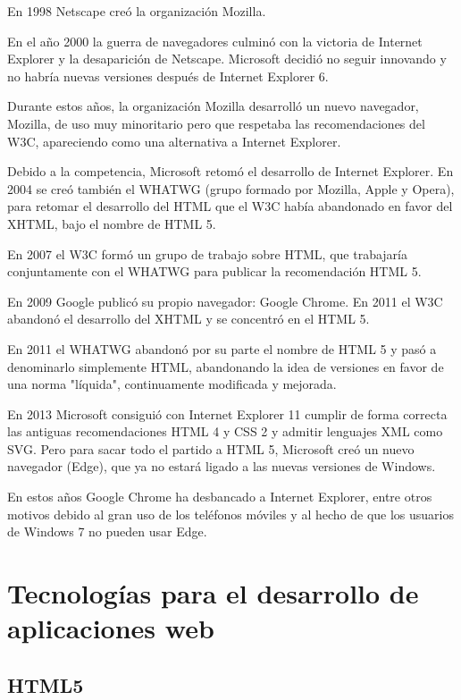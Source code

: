 \documentclass[a4paper, 12pt]{book}
\begin{document}
En 1998 Netscape cre\'o la organizaci\'on Mozilla.

En el a\~no 2000 la guerra de navegadores culmin\'o con la victoria de Internet Explorer y la desaparici\'on de Netscape. Microsoft decidi\'o no seguir innovando y no habr\'ia nuevas versiones despu\'es de Internet Explorer 6.

Durante estos a\~nos, la organizaci\'on Mozilla desarroll\'o un nuevo navegador, Mozilla, de uso muy minoritario pero que respetaba las recomendaciones del W3C, apareciendo como una alternativa a Internet Explorer.

Debido a la competencia, Microsoft retom\'o el desarrollo de Internet Explorer. En 2004 se cre\'o tambi\'en el WHATWG (grupo formado por Mozilla, Apple y Opera), para retomar el desarrollo del HTML que el W3C hab\'ia abandonado en favor del XHTML, bajo el nombre de HTML 5.

En 2007 el W3C form\'o un grupo de trabajo sobre HTML, que trabajar\'ia conjuntamente con el WHATWG para publicar la recomendaci\'on HTML 5.

En 2009 Google public\'o su propio navegador: Google Chrome. En 2011 el W3C abandon\'o el desarrollo del XHTML y se concentr\'o en el HTML 5.

En 2011 el WHATWG abandon\'o por su parte el nombre de HTML 5 y pas\'o a denominarlo simplemente HTML, abandonando la idea de versiones en favor de una norma "l\'iquida", continuamente modificada y mejorada.

En 2013 Microsoft consigui\'o con Internet Explorer 11 cumplir de forma correcta las antiguas recomendaciones HTML 4 y CSS 2 y admitir lenguajes XML como SVG. Pero para sacar todo el partido a HTML 5, Microsoft cre\'o un nuevo navegador (Edge), que ya no estar\'a ligado a las nuevas versiones de Windows.

En estos a\~nos Google Chrome ha desbancado a Internet Explorer, entre otros motivos debido al gran uso de los tel\'efonos m\'oviles y al hecho de que los usuarios de Windows 7 no pueden usar Edge.



\section{Tecnolog\'ias para el desarrollo de aplicaciones web}
\label{sec:seccion}


\subsection{HTML5}
\label{subsec:estilo}
\end{document}
